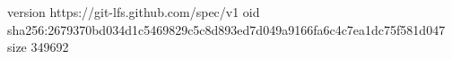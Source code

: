 version https://git-lfs.github.com/spec/v1
oid sha256:2679370bd034d1c5469829c5c8d893ed7d049a9166fa6c4c7ea1dc75f581d047
size 349692
